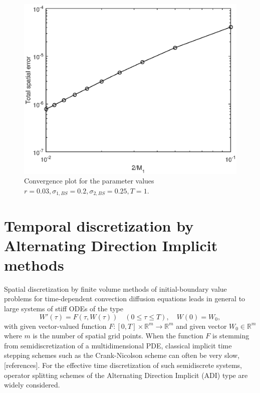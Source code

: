 \documentclass[10pt]{article}
\def\R{\mathbb{R}}
\begin{document}
\begin{figure}
\begin{center}
\includegraphics[scale=0.5]{Convergence2DBS.eps}  
\caption{Convergence plot for the parameter values $r = 0.03, \sigma_{1,BS} = 0.2, \sigma_{2,BS}=0.25, T=1$.}
\label{fig:Convergence2DBS}
\end{center}
\end{figure}










\setcounter{equation}{0}
\section{Temporal discretization by Alternating Direction Implicit methods}\label{ADI}

Spatial discretization by finite volume methods of initial-boundary value problems for time-dependent convection diffusion equations leads in general to large systems of stiff ODEs of the type  
$$ W'(\tau) = F(\tau, W(\tau)) \quad (0\leq \tau \leq T), \quad W(0) = W_{0}, $$
with given vector-valued function $F:[0,T]\times \R^{m} \rightarrow \R^{m}$ and given vector $W_{0} \in \R^{m}$ where $m$ is the number of spatial grid points.
When the function $F$ is stemming from semidiscretization of a multidimensional PDE, classical implicit time stepping schemes such as the Crank-Nicolson scheme can often be very slow, [references]. For the effective time discretization of such semidiscrete systems, operator splitting schemes of the Alternating Direction Implicit (ADI) type are widely considered.
\end{document}
